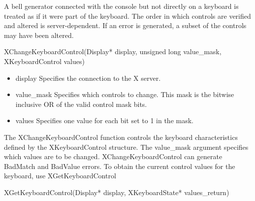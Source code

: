 \documentclass{report}
\begin{document}
\begin{itemize}
            \bigbreak \noindent 
            A bell generator connected with the console but not directly on a keyboard is treated as if it were part of the keyboard. The order in which controls are verified and altered is server-dependent. If an error is generated, a subset of the controls may have been altered.
            \bigbreak \noindent 
            \begin{cppcode}
            XChangeKeyboardControl(Display* display, unsigned long value_mask, XKeyboardControl values)
            \end{cppcode}
            \bigbreak \noindent
            \begin{itemize}
                \item display Specifies the connection to the X server.
                \item value\_mask Specifies which controls to change. This mask is the bitwise inclusive OR of the valid control mask bits.
                \item values Specifies one value for each bit set to 1 in the mask.
            \end{itemize}
            The XChangeKeyboardControl function controls the keyboard characteristics defined by the XKeyboardControl structure. The value\_mask argument specifies which values are to be changed.
            \bigbreak \noindent 
            XChangeKeyboardControl can generate BadMatch and BadValue errors.
            \bigbreak \noindent 
            To obtain the current control values for the keyboard, use XGetKeyboardControl
            \bigbreak \noindent 
            \begin{cppcode}
            XGetKeyboardControl(Display* display, XKeyboardState* values_return)
            \end{cppcode}
            \bigbreak \noindent
\end{itemize}
\end{document}
